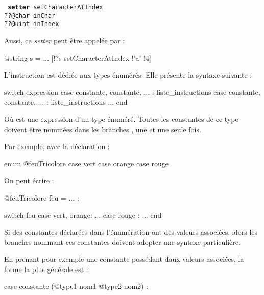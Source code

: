 {{\texttt{
\textbf{setter} setCharacterAtIndex\\
\hspace*{2cm}??@char inChar\\
\hspace*{2cm}??@uint inIndex
}

Aussi, ce \emph{setter} peut être appelée par :
\begin{galgascode}
@string s = ...
[!?s setCharacterAtIndex !'a' !4]
\end{galgascode}







L'instruction  est dédiée aux types énumérés. Elle présente la syntaxe suivante :

\begin{galgascode}
switch expression
case constante, constante, ... :
  liste_instructions
case constante, constante, ... :
  liste_instructions
...
end
\end{galgascode}


Où  est une expression d'un type énuméré. Toutes les constantes de ce type doivent être nommées dans les branches , une et une seule fois.

Par exemple, avec la déclaration :

\begin{galgascode}
enum @feuTricolore {
  case vert
  case orange
  case rouge
}
\end{galgascode}

On peut écrire :

\begin{galgascode}
@feuTricolore feu = ... ;

switch feu
case vert, orange:
  ...
case rouge :
  ...
end
\end{galgascode}

Si des constantes déclarées dans l'énumération ont des valeurs associées, alors les branches  nommant ces constantes doivent adopter une syntaxe particulière. 

En prenant pour exemple une constante possédant daux valeurs associées, la forme la plus générale est :

\begin{galgascode}
case constante (@type1 nom1 @type2 nom2) :
\end{galgascode}

}}

